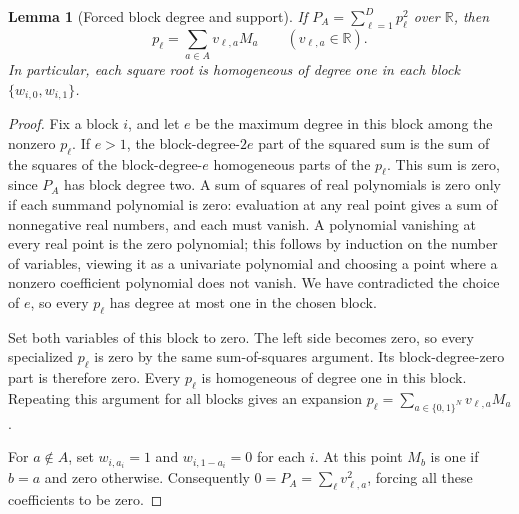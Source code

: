 \documentclass[11pt]{article}
\newtheorem{lemma}[theorem]{Lemma}
\theoremstyle{definition}
\theoremstyle{remark}
\begin{document}
\begin{lemma}[Forced block degree and support]
\label{lem:sos-forced-support}
If $P_A=\sum_{\ell=1}^{D}p_\ell^2$ over $\mathbb R$, then
\[
 p_\ell=\sum_{a\in A}v_{\ell,a}M_a
 \qquad(v_{\ell,a}\in\mathbb R).
\]
In particular, each square root is homogeneous of degree one in each
block $\{w_{i,0},w_{i,1}\}$.
\end{lemma}
\begin{proof}
Fix a block $i$, and let $e$ be the maximum degree in this block among
the nonzero $p_\ell$.  If $e>1$, the block-degree-$2e$ part of the
squared sum is the sum of the squares of the block-degree-$e$
homogeneous parts of the $p_\ell$.  This sum is zero, since $P_A$ has
block degree two.  A sum of squares of real polynomials is zero only
if each summand polynomial is zero: evaluation at any real point
gives a sum of nonnegative real numbers, and each must vanish.
A polynomial vanishing at every real point is the zero polynomial;
this follows by induction on the number of variables, viewing it as a
univariate polynomial and choosing a point where a nonzero coefficient
polynomial does not vanish.
We have contradicted the choice of $e$, so every $p_\ell$ has degree
at most one in the chosen block.

Set both variables of this block to zero.  The left side becomes zero,
so every specialized $p_\ell$ is zero by the same sum-of-squares
argument.  Its block-degree-zero part is therefore zero.
Every $p_\ell$ is homogeneous of degree one in this block.
Repeating this argument for all blocks gives an expansion
$p_\ell=\sum_{a\in\{0,1\}^N}v_{\ell,a}M_a$.

For $a\notin A$, set $w_{i,a_i}=1$ and $w_{i,1-a_i}=0$ for each $i$.
At this point $M_b$ is one if $b=a$ and zero otherwise.
Consequently $0=P_A=\sum_\ell v_{\ell,a}^2$, forcing all these
coefficients to be zero.
\end{proof}
\end{document}
